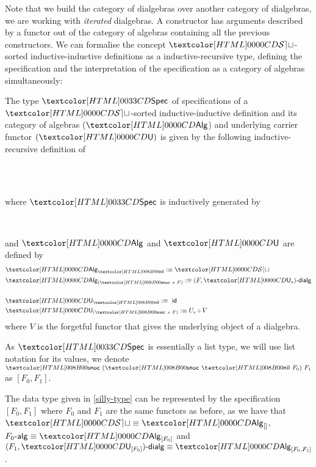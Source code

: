 Note that we build the category of dialgebras over another category of
dialgebras, \ie we are working with \emph{iterated} dialgebras. A
constructor has arguments described by a functor out of the category
of algebras containing all the previous constructors. We can formalise
the concept $\SET$-sorted inductive-inductive definitions as a
inductive-recursive type, defining the specification and the
interpretation of the specification as a category of algebras
simultaneously:
%
\begin{definition}
  \label{type-sorted-spec}
  The type $\specty$ of specifications of a $\SET$-sorted
  inductive-inductive definition and its category of algebras ($\Alg$)
  and underlying carrier functor $(\Und)$ is given by the following
  inductive-recursive definition of
  \begin{sorts}
    \sortnamety{\specty}{\Set} \\
    \functy{\Alg}{\specty \to \Cat} \\
  \end{sorts}
  where $\specty$ is inductively generated by
  \begin{datatype}{\specty}{}
    \constr{\specnil}{\specty} \\
  \end{datatype}
  and $\Alg$ and $\Und$ are defined by
  \begin{align*}
    &\Alg_{\specnil} \ddefeq \SET \\
    &\Alg_{(\specsnoc\ s\ F)} \ddefeq \dialgcat{F}{\Und_s} \\
    \\
    &\Und_{\specnil} \ddefeq\ \id \\
    &\Und_{(\specsnoc\ s\ F)} \ddefeq U_s \circ V
  \end{align*}
  where $V$ is the forgetful functor that gives the underlying object of
  a dialgebra.
\end{definition}

As $\specty$ is essentially a list type, we will use list notation for
its values, \eg we denote $\specsnoc\ (\specsnoc\ \specnil\ F_0)\ F_1$
as $[F_0,F_1]$.

\begin{example}
  The data type given in \cref{silly-type} can be represented by the
  specification $[F_0, F_1]$ where $F_0$ and $F_1$ are the same
  functors as before, as we have that $\SET \defeq \Alg_{[]}$,
  $\algcat{F_0} \defeq \Alg_{[F_0]}$ and
  $\dialgcat{F_1}{\Und_{[F_0]}} \defeq \Alg_{[F_0,F_1]}$.
\end{example}

